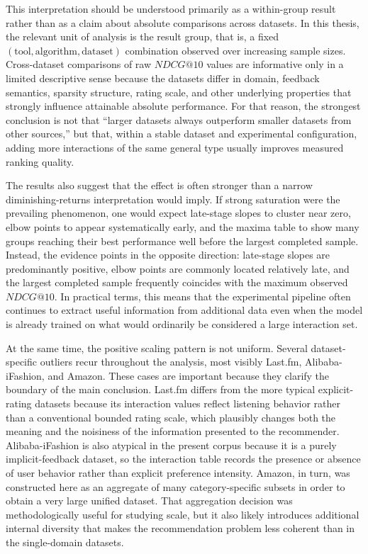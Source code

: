 \documentclass[12pt,a4paper]{article}
\begin{document}
This interpretation should be understood primarily as a within-group result rather than as a claim about absolute comparisons across datasets. In this thesis, the relevant unit of analysis is the result group, that is, a fixed $(\text{tool}, \text{algorithm}, \text{dataset})$ combination observed over increasing sample sizes. Cross-dataset comparisons of raw $NDCG@10$ values are informative only in a limited descriptive sense because the datasets differ in domain, feedback semantics, sparsity structure, rating scale, and other underlying properties that strongly influence attainable absolute performance. For that reason, the strongest conclusion is not that ``larger datasets always outperform smaller datasets from other sources,'' but that, within a stable dataset and experimental configuration, adding more interactions of the same general type usually improves measured ranking quality.

The results also suggest that the effect is often stronger than a narrow diminishing-returns interpretation would imply. If strong saturation were the prevailing phenomenon, one would expect late-stage slopes to cluster near zero, elbow points to appear systematically early, and the maxima table to show many groups reaching their best performance well before the largest completed sample. Instead, the evidence points in the opposite direction: late-stage slopes are predominantly positive, elbow points are commonly located relatively late, and the largest completed sample frequently coincides with the maximum observed $NDCG@10$. In practical terms, this means that the experimental pipeline often continues to extract useful information from additional data even when the model is already trained on what would ordinarily be considered a large interaction set.

At the same time, the positive scaling pattern is not uniform. Several dataset-specific outliers recur throughout the analysis, most visibly Last.fm, Alibaba-iFashion, and Amazon. These cases are important because they clarify the boundary of the main conclusion. Last.fm differs from the more typical explicit-rating datasets because its interaction values reflect listening behavior rather than a conventional bounded rating scale, which plausibly changes both the meaning and the noisiness of the information presented to the recommender. Alibaba-iFashion is also atypical in the present corpus because it is a purely implicit-feedback dataset, so the interaction table records the presence or absence of user behavior rather than explicit preference intensity. Amazon, in turn, was constructed here as an aggregate of many category-specific subsets in order to obtain a very large unified dataset. That aggregation decision was methodologically useful for studying scale, but it also likely introduces additional internal diversity that makes the recommendation problem less coherent than in the single-domain datasets.
\end{document}
